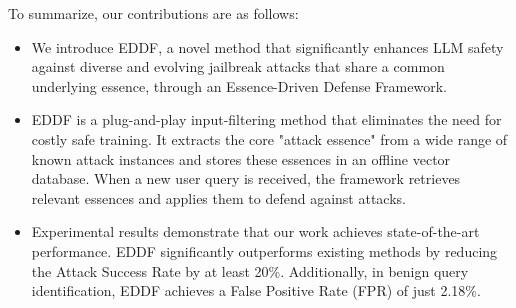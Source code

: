 To summarize, our contributions are as follows:
\begin{itemize}
      \item We introduce EDDF, a novel method that significantly enhances LLM safety against diverse and evolving jailbreak attacks that share a common underlying essence, through an Essence-Driven Defense Framework.
      \item EDDF is a plug-and-play input-filtering method that eliminates the need for costly safe training. It extracts the core "attack essence" from a wide range of known attack instances and stores these essences in an offline vector database. When a new user query is received, the framework retrieves relevant essences and applies them to defend against attacks. 
      \item Experimental results demonstrate that our work achieves state-of-the-art performance. EDDF significantly outperforms existing methods by reducing the Attack Success Rate by at least 20\%. Additionally, in benign query identification, EDDF achieves a False Positive Rate (FPR) of just 2.18\%.
\end{itemize}

